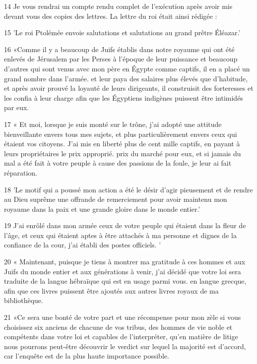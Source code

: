 \par 14 Je vous rendrai un compte rendu complet de l'exécution après avoir mis devant vous des copies des lettres. La lettre du roi était ainsi rédigée :

\par 15 'Le roi Ptolémée envoie salutations et salutations au grand prêtre Éléazar.'

\par 16 «Comme il y a beaucoup de Juifs établis dans notre royaume qui ont été enlevés de Jérusalem par les Perses à l'époque de leur puissance et beaucoup d'autres qui sont venus avec mon père en Égypte comme captifs, il en a placé un grand nombre dans l'armée. et leur paya des salaires plus élevés que d'habitude, et après avoir prouvé la loyauté de leurs dirigeants, il construisit des forteresses et les confia à leur charge afin que les Égyptiens indigènes puissent être intimidés par eux.

\par 17 « Et moi, lorsque je suis monté sur le trône, j'ai adopté une attitude bienveillante envers tous mes sujets, et plus particulièrement envers ceux qui étaient vos citoyens. J'ai mis en liberté plus de cent mille captifs, en payant à leurs propriétaires le prix approprié. prix du marché pour eux, et si jamais du mal a été fait à votre peuple à cause des passions de la foule, je leur ai fait réparation.

\par 18 'Le motif qui a poussé mon action a été le désir d'agir pieusement et de rendre au Dieu suprême une offrande de remerciement pour avoir maintenu mon royaume dans la paix et une grande gloire dans le monde entier.'

\par 19 J'ai enrôlé dans mon armée ceux de votre peuple qui étaient dans la fleur de l'âge, et ceux qui étaient aptes à être attachés à ma personne et dignes de la confiance de la cour, j'ai établi des postes officiels. '

\par 20 « Maintenant, puisque je tiens à montrer ma gratitude à ces hommes et aux Juifs du monde entier et aux générations à venir, j'ai décidé que votre loi sera traduite de la langue hébraïque qui est en usage parmi vous. en langue grecque, afin que ces livres puissent être ajoutés aux autres livres royaux de ma bibliothèque.

\par 21 «Ce sera une bonté de votre part et une récompense pour mon zèle si vous choisissez six anciens de chacune de vos tribus, des hommes de vie noble et compétents dans votre loi et capables de l'interpréter, qu'en matière de litige nous pourrons peut-être découvrir le verdict sur lequel la majorité est d'accord, car l'enquête est de la plus haute importance possible.

